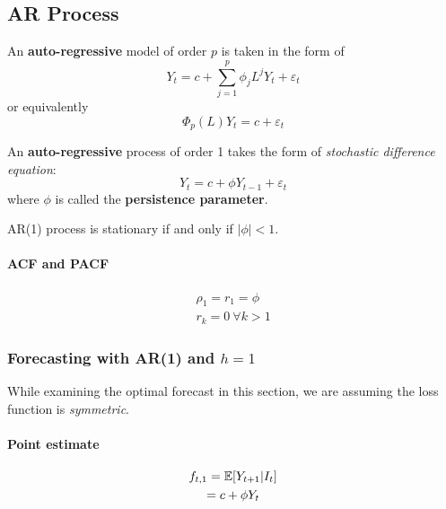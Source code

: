 \documentclass[11pt]{article}
\begin{document}
		\subsection{AR Process}
			\begin{definition}
				An \textbf{auto-regressive} model of order $p$ is taken in the form of 
				\begin{equation}
					Y_t = c + \sum_{j=1}^p \phi_j L^j Y_t + \varepsilon_t
				\end{equation}
				or equivalently
				\begin{equation}
					\Phi_p(L) Y_t = c + \varepsilon_t
				\end{equation}
			\end{definition}
			
			\begin{definition}
				An \textbf{auto-regressive} process of order 1 takes the form of \emph{stochastic difference equation}:
				\begin{equation}
					Y_t = c + \phi Y_{t-1} + \varepsilon_t
				\end{equation}
				where $\phi$ is called the \textbf{persistence parameter}.
			\end{definition}
		
		\begin{proposition}
			AR(1) process is stationary if and only if $|\phi| < 1$.
		\end{proposition}
		
		\paragraph{ACF and PACF}
			\begin{gather}
				\rho_1 = r_1 = \phi \\
				r_k = 0\ \forall k > 1
			\end{gather}
			
		\subsubsection{Forecasting with AR(1) and $h=1$}
			\begin{assumption}
				While examining the optimal forecast in this section, we are assuming the loss function is \emph{symmetric}.
			\end{assumption}
			
			\paragraph{Point estimate}
				\begin{gather}
					f_{t,1} = \mathbb{E}[{Y_{t+1}|I_t}] \\
					= c + \phi Y_t
				\end{gather}
\end{document}
